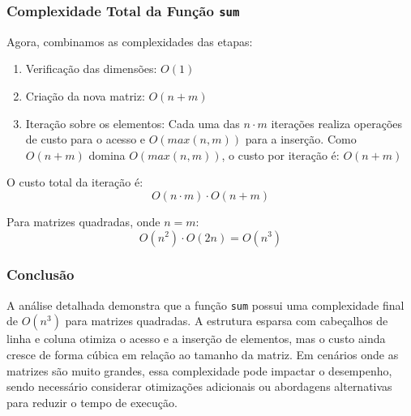 \documentclass[12pt]{article}
\begin{document}
\subsubsection{Complexidade Total da Função \texttt{sum}}

Agora, combinamos as complexidades das etapas:

    \begin{enumerate}
        \item Verificação das dimensões: \(O(1)\)
        \item Criação da nova matriz: \(O(n + m)\)
        \item Iteração sobre os elementos: Cada uma das \(n \cdot m\) iterações realiza operações de custo  para o acesso e \(O(max(n, m))\) para a inserção. Como \(O(n + m)\) domina \(O(max(n, m))\), o custo por iteração é: \(O(n + m)\)
    \end{enumerate}
    
O custo total da iteração é:    
    \begin{equation}
        O(n \cdot m) \cdot O(n + m)
    \end{equation}

Para matrizes quadradas, onde \(n = m\):
    \begin{equation}
        O(n^2) \cdot O(2n) = O(n^3)
    \end{equation}

\subsubsection{Conclusão}

A análise detalhada demonstra que a função \texttt{sum} possui uma complexidade final de \(O(n^3)\) para matrizes quadradas. A estrutura esparsa com cabeçalhos de linha e coluna otimiza o acesso e a inserção de elementos, mas o custo ainda cresce de forma cúbica em relação ao tamanho da matriz. Em cenários onde as matrizes são muito grandes, essa complexidade pode impactar o desempenho, sendo necessário considerar otimizações adicionais ou abordagens alternativas para reduzir o tempo de execução.





\cite{cplusplus} 
\cite{Algoritmos} 
\cite{video}
\cite{matriz} 
\cite{matrixCalc}
\cite{enwiki:1269320093} 
\end{document}

